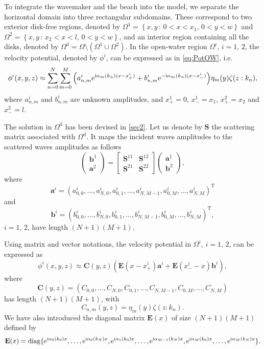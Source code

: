\documentclass[12pt,a4paper]{article}
\def\ci{{\mathrm i}}
\renewcommand{\exp}{{\rm e}}
\newcommand{\ie}{i.e.\ }
\newcommand{\vp}{{\phi}}
\newcommand{\vm}{{\zeta}}
\newcommand{\ym}{{\eta}}
\newcommand{\kx}{\alpha}
\begin{document}
To integrate the wavemaker and the beach into the model, we separate the horizontal domain into three 
rectangular subdomains. These correspond to two exterior disk-free regions, denoted by $\Omega^{1} = 
\left\{x,y\,:\,0<x<x_1,\,0<y<w\right\}$ and $\Omega^{2} = \left\{x,y\,:\,x_2<x<l,\,0<y<w\right\}$, and an 
interior region containing all the disks, denoted by $\Omega^{\mathrm{d}} = \Omega \setminus 
\left(\Omega^{1} \cup \Omega^{2}\right)$. In the open-water region $\Omega^{i}$, $i=1,\,2$, the velocity 
potential, denoted by $\vp^i$, can be expressed as in \eqref{eq:PotOW}, \ie
\begin{equation}
\vp^i(x,y,z) \approx \sum_{n=0}^{N} \sum_{m=0}^{M} \Big(a^i_{n,m}\exp^{\ci\kx_{m}(k_{n}) (x-x^i_+)} + 
b^i_{n,m}\exp^{-\ci\kx_{m}(k_{n}) (x-x^i_-)}\Big) \ym_{m}(y) \vm(z:k_{n}),
\end{equation}
where $a^i_{n,m}$ and $b^i_{n,m}$ are unknown amplitudes, and $x^1_+=0$, $x^1_-=x_1$, $x^2_+=x_2$ and 
$x^2_-=l$.

The solution in $\Omega^{\mathrm{d}}$ has been devised in \textsection \ref{sec2}. Let us denote by 
$\mathbf{S}$ the scattering matrix associated with $\Omega^{\mathrm{d}}$. It maps the incident waves 
amplitudes to the scattered waves amplitudes as follows
\begin{equation}
	\left(
	\begin{array}{c}
		\mathbf{b}^1 \\
		\mathbf{a}^2
	\end{array}
	\right) = \left[
	\begin{array}{cc}
	\mathbf{S}^{11} & \mathbf{S}^{12} \\
	\mathbf{S}^{21} & \mathbf{S}^{22}
	\end{array}
	\right] \left(
	\begin{array}{c}
		\mathbf{a}^1 \\
		\mathbf{b}^2
	\end{array}
	\right),
\end{equation}
where 
\[
	\mathbf{a}^i = \left(a^i_{0,0},\ldots,a^i_{N,0},a^i_{0,1},\ldots,a^i_{N,M-1},a^i_{0,M},\ldots
	,a^i_{N,M}\right)^{\mathrm{T}}
\]
and 
\[
	\mathbf{b}^i = \left(b^i_{0,0},\ldots,b^i_{N,0},b^i_{0,1},\ldots,b^i_{N,M-1},b^i_{0,M},\ldots
	,b^i_{N,M}\right)^{\mathrm{T}},
\]
$i=1,\,2$, have length $(N+1)(M+1)$.

Using matrix and vector notations, the velocity potential in $\Omega^{i}$, $i=1,\,2$, can be expressed as
\begin{equation}
  \label{eq:MatPot}
 \vp^i(x,y,z) \approx \mathbf{C}(y,z)\left(\mathbf{E}(x-x^i_+)\mathbf{a}^i + 
 \mathbf{E}(x^i_--x)\mathbf{b}^i\right),
\end{equation}
where
\[
  \mathbf{C}(y,z) = \left(C_{0,0},\ldots,C_{N,0},C_{0,1},\ldots,C_{N,M-1},C_{0,M},\ldots,C_{N,M}\right)
\]
has length $(N+1)(M+1)$, with 
\[
  C_{n,m}(y,z) = \ym_{m}(y) \vm(z:k_{n}).
\]
We have also introduced the diagonal matrix $\mathbf{E}(x)$ of size $(N+1)(M+1)$ defined by
\[
  \mathbf{E}(x) = \mathrm{diag}\{\exp^{\ci\kx_{0}(k_{0})x},\ldots,\exp^{\ci\kx_{0}(k_{N})x},
  \exp^{\ci\kx_{1}(k_{0})x},\ldots,\exp^{\ci\kx_{M-1}(k_{N})x},\exp^{\ci\kx_{M}(k_{0})x},\ldots,
  \exp^{\ci\kx_{M}(k_{N})x}\}.
\]
\end{document}
